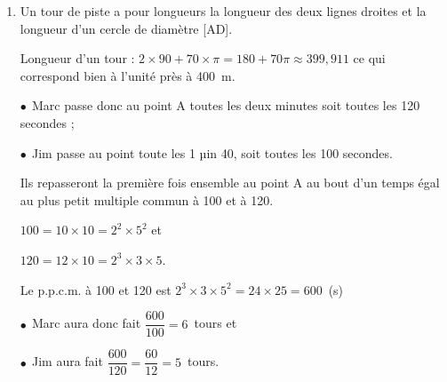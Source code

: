 \begin{enumerate}[resume]
\item %
Un tour de piste a pour longueurs la longueur des deux lignes droites et la longueur d'un cercle de diamètre [AD].

Longueur d'un tour  : $2 \times 90 + 70 \times \pi = 180 + 70\pi \approx 399,911$ ce qui correspond bien à l'unité près à 400~m.

$\bullet~~$Marc passe donc au point A toutes les deux minutes soit toutes les 120 secondes ;

$\bullet~~$Jim passe au point toute les 1 µin 40, soit toutes les 100 secondes.

Ils repasseront la première fois ensemble au point A au bout d'un temps égal au plus petit multiple commun à 100 et à 120.

$100 = 10 \times 10 = 2^2 \times 5^2$ et 

$120 = 12 \times 10 = 2^3 \times 3 \times 5$.

Le p.p.c.m. à 100 et 120 est $2^3 \times 3 \times 5^2  = 24 \times 25 = 600$~(s)

$\bullet~~$Marc aura donc fait $\dfrac{600}{100} = 6$~tours et 

$\bullet~~$Jim aura fait $\dfrac{600}{120} = \dfrac{60}{12} = 5$~tours.
\smallskip

\end{enumerate}

\vspace{0.5cm}

